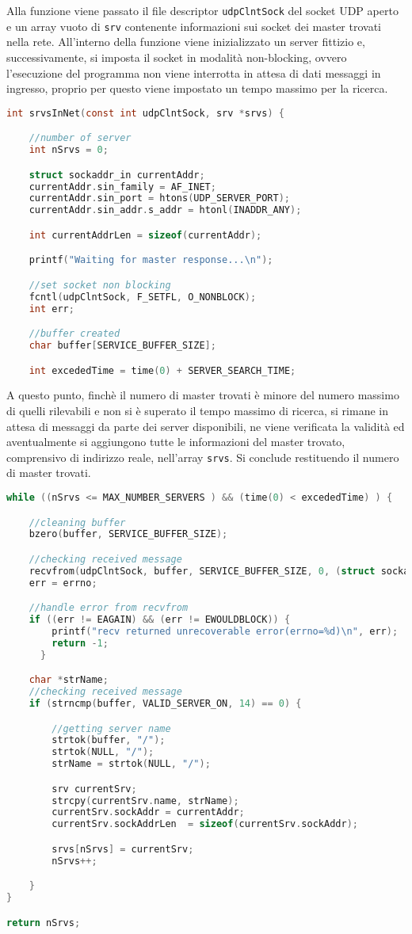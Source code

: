 \documentclass[11pt,fleqn]{book} %
\begin{document}
Alla funzione viene passato il file descriptor \texttt{udpClntSock} del socket UDP aperto e un array vuoto di \texttt{srv} contenente informazioni sui socket dei master trovati nella rete.
All'interno della funzione viene inizializzato un server fittizio e, successivamente, si imposta il socket in modalità non-blocking, ovvero l'esecuzione del programma non viene interrotta in attesa di dati messaggi in ingresso, proprio per questo viene impostato un tempo massimo per la ricerca.
\begin{lstlisting}[language=C]
int srvsInNet(const int udpClntSock, srv *srvs) {

	//number of server
	int nSrvs = 0;

	struct sockaddr_in currentAddr;
	currentAddr.sin_family = AF_INET;
	currentAddr.sin_port = htons(UDP_SERVER_PORT);
	currentAddr.sin_addr.s_addr = htonl(INADDR_ANY);

	int currentAddrLen = sizeof(currentAddr);

	printf("Waiting for master response...\n");

	//set socket non blocking
	fcntl(udpClntSock, F_SETFL, O_NONBLOCK);
	int err;

	//buffer created
	char buffer[SERVICE_BUFFER_SIZE];

	int excededTime = time(0) + SERVER_SEARCH_TIME;
\end{lstlisting}

A questo punto, finchè il numero di master trovati è minore del numero massimo di quelli rilevabili e non si è superato il tempo massimo di ricerca, si rimane in attesa di messaggi da parte dei server disponibili, ne viene verificata la validità ed aventualmente si aggiungono tutte le informazioni del master trovato, comprensivo di indirizzo reale, nell'array \texttt{srvs}. Si conclude restituendo il numero di master trovati.

\begin{lstlisting}[language=C]
while ((nSrvs <= MAX_NUMBER_SERVERS ) && (time(0) < excededTime) ) {

	//cleaning buffer
	bzero(buffer, SERVICE_BUFFER_SIZE);

	//checking received message
	recvfrom(udpClntSock, buffer, SERVICE_BUFFER_SIZE, 0, (struct sockaddr *) &currentAddr, &currentAddrLen);
	err = errno;

	//handle error from recvfrom
	if ((err != EAGAIN) && (err != EWOULDBLOCK)) {
      	printf("recv returned unrecoverable error(errno=%d)\n", err);
      	return -1;
      }

	char *strName;
	//checking received message
	if (strncmp(buffer, VALID_SERVER_ON, 14) == 0) {

		//getting server name
		strtok(buffer, "/");
		strtok(NULL, "/");
		strName = strtok(NULL, "/");

		srv currentSrv;
		strcpy(currentSrv.name, strName);
		currentSrv.sockAddr = currentAddr;
		currentSrv.sockAddrLen  = sizeof(currentSrv.sockAddr);

		srvs[nSrvs] = currentSrv;
		nSrvs++;

	}	
}

return nSrvs;

\end{lstlisting}
\end{document}
